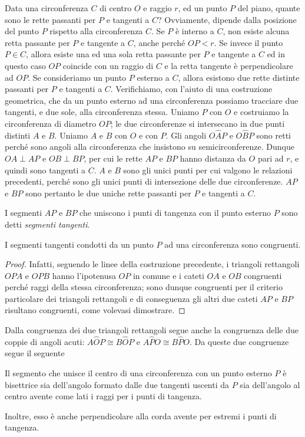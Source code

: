 Data una circonferenza $C$ di centro $O$ e raggio $r$, ed un punto $P$ del piano, quante sono le rette passanti per $P$ e tangenti a $C$?  Ovviamente, dipende dalla posizione del punto $P$ rispetto alla circonferenza $C$. Se $P$ è interno a $C$, non esiste alcuna retta passante per $P$ e tangente a $C$, anche perché $OP < r$. Se invece il punto $P\in C$, allora esiste una ed una sola retta passante per $P$ e tangente a $C$ ed in questo caso $OP$ coincide con un raggio di $C$ e la retta tangente è perpendicolare ad $OP$.
Se consideriamo un punto $P$ esterno a $C$, allora esistono due rette distinte passanti per $P$ e tangenti a $C$. Verifichiamo, con l'aiuto di una costruzione geometrica, che da un punto esterno ad una circonferenza possiamo tracciare due tangenti, e due sole, alla circonferenza stessa.
Uniamo $P$ con $O$ e costruiamo la circonferenza di diametro $OP$; le due circonferenze si intersecano in due punti distinti $A$ e $B$. Uniamo $A$ e $B$ con $O$ e con $P$. Gli angoli $O\widehat{A}P$ e $O\widehat{B}P$ sono retti perché sono angoli alla circonferenza che insistono su semicirconferenze. Dunque $OA\perp AP$ e $OB\perp BP$, per cui le rette $AP$ e $BP$ hanno distanza da $O$ pari ad $r$, e quindi sono tangenti a $C$. $A$ e $B$ sono gli unici punti per cui valgono le relazioni precedenti, perché sono gli unici punti di intersezione delle due circonferenze. $AP$ e $BP$ sono pertanto le due uniche rette passanti per $P$ e tangenti a $C$.

I segmenti $AP$ e $BP$ che uniscono i punti di tangenza con il punto esterno $P$ sono detti \emph{segmenti tangenti}.

\begin{teorema}
I segmenti tangenti condotti da un punto $P$ ad una circonferenza sono congruenti.
\end{teorema}

\begin{proof}
Infatti, seguendo le linee della costruzione precedente, i triangoli rettangoli $OPA$ e $OPB$ hanno l'ipotenusa $OP$ in comune e i cateti $OA$ e $OB$ congruenti perché raggi della stessa circonferenza; sono dunque congruenti per il criterio particolare dei triangoli rettangoli e di conseguenza gli altri due cateti $AP$ e $BP$ risultano congruenti, come volevasi dimostrare.
\end{proof}

Dalla congruenza dei due triangoli rettangoli segue anche la congruenza delle due coppie di angoli acuti: $A\widehat{O}P\cong B\widehat{O}P$ e $A\widehat{P}O\cong B\widehat{P}O$. Da queste due congruenze segue il seguente 
\begin{corollario}
Il segmento che unisce il centro di una circonferenza con un punto esterno $P$ è bisettrice sia dell'angolo formato dalle due tangenti uscenti da $P$ sia dell'angolo al centro avente come lati i raggi per i punti di tangenza.
\end{corollario}
Inoltre, esso è anche perpendicolare alla corda avente per estremi i punti di tangenza.


